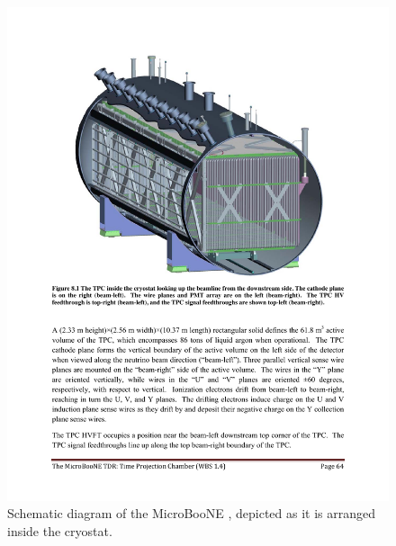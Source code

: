 \begin{figure}
\centering	
\includegraphics[width=0.8\linewidth]{figures/cryo_tpc.pdf}
\caption{Schematic diagram of the MicroBooNE \lartpc, depicted as it is arranged inside the cryostat.}
\label{fig:tpc-cryostat}
\end{figure}


%
